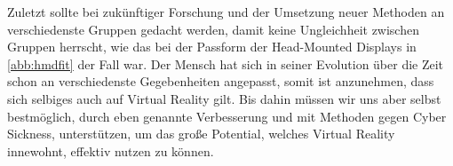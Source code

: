 Zuletzt sollte bei zuk\"unftiger Forschung und der Umsetzung neuer Methoden an verschiedenste Gruppen gedacht werden, damit keine Ungleichheit zwischen Gruppen herrscht, wie das bei der Passform der Head-Mounted Displays in \autoref{abb:hmdfit} der Fall war. Der Mensch hat sich in seiner Evolution \"uber die Zeit schon an verschiedenste Gegebenheiten angepasst, somit ist anzunehmen, dass sich selbiges auch auf Virtual Reality gilt. Bis dahin m\"ussen wir uns aber selbst bestm\"oglich, durch eben genannte Verbesserung und mit Methoden gegen Cyber Sickness, unterst\"utzen, um das gro{\ss}e Potential, welches Virtual Reality innewohnt, effektiv nutzen zu k\"onnen.

